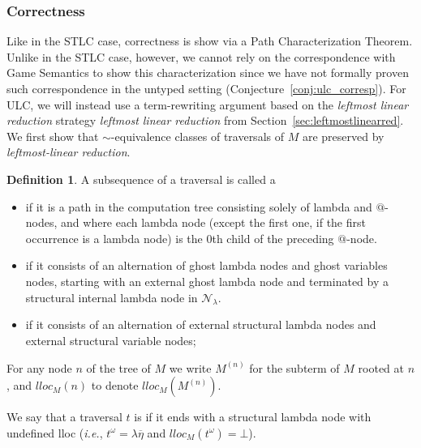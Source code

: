 \documentclass{article}
\makeatletter
\theoremstyle{definition}
\newtheorem{definition}{Definition}[section]
\newcommand\Nodes{\mathcal{N}}%
\newcommand\NodesLmd{\Nodes_\lambda}%
\renewcommand\ie{{\it i.e.\@\xspace}}
\makeatother
\begin{document}
\subsubsection*{Correctness}

Like in the STLC case, correctness is show via a Path Characterization Theorem.
Unlike in the STLC case, however, we cannot rely on the correspondence with Game Semantics to show this characterization since we have not formally proven such correspondence in the untyped setting (Conjecture~\ref{conj:ulc_corresp}).
For ULC, we will instead use a term-rewriting argument based on the \emph{leftmost linear reduction} strategy \emph{leftmost linear reduction} from Section~\ref{sec:leftmostlinearred}. We first show that $\sim$-equivalence classes of traversals of $M$ are preserved by \emph{leftmost-linear reduction}.

\begin{definition}
A subsequence of a traversal is called a
\begin{itemize}
\item {} if it is a path in the computation tree consisting solely of lambda and $@$-nodes, and where each lambda node (except the first one, if the first occurrence is a lambda node) is the $0$th child of the preceding $@$-node.
\item {} if it consists of an alternation of ghost lambda nodes and ghost variables nodes, starting with an external ghost lambda node and terminated by a structural internal lambda node in $\NodesLmd$.
\item {} if it consists of an alternation of external structural lambda nodes and external structural variable nodes;
\end{itemize}
\end{definition}

For any node $n$ of the tree of $M$ we write $M^{(n)}$ for the subterm of $M$ rooted at $n$, and $lloc_M(n)$ to denote $lloc_M(M^{(n)})$.

We say that a traversal $t$ is  if it ends with a structural lambda node with undefined lloc (\ie, $t^\omega = \lambda\overline\eta$ and $lloc_M(t^\omega) = \bot$).
\end{document}
